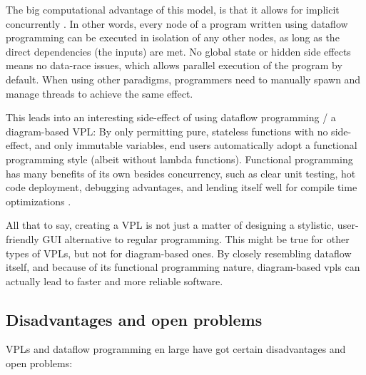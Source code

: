The big computational advantage of this model, is that it allows for implicit concurrently \citep{sousa_dataflow_2012}. 
In other words, every node of a program written using dataflow programming can be executed in isolation of any other nodes, as long as the direct dependencies (the inputs) are met. 
No global state or hidden side effects means no data-race issues, which allows parallel execution of the program by default.
When using other paradigms, programmers need to manually spawn and manage threads to achieve the same effect. 

This leads into an interesting side-effect of using dataflow programming / a diagram-based \ac{VPL}: 
By only permitting pure, stateless functions with no side-effect, and only immutable variables, end users automatically adopt a functional programming style (albeit without lambda functions).
Functional programming has many benefits of its own besides concurrency, such as clear unit testing, hot code deployment, debugging advantages, and lending itself well for compile time optimizations \citep{akhmechet_functional_2006, elliott_tangible_2007}.




All that to say, creating a \ac{VPL} is not just a matter of designing a stylistic, user-friendly \ac{GUI} alternative to regular programming.
This might be true for other types of VPLs, but not for diagram-based ones. 
By closely resembling dataflow itself, and because of its functional programming nature, diagram-based vpls can actually lead to faster and more reliable software.

\subsection{Disadvantages and open problems}
\label{sec:background:vpl:disadvantages}
 
\ac{VPL}s and dataflow programming en large have got certain disadvantages and open problems:

